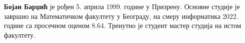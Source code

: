 \documentclass[12pt,oneside]{memoir}
\begin{document}
\literatura

\backmatter

\begin{biografija}
\textbf{Бојан Барџић} је рођен 5. априла 1999. године у Призрену. Основне студије
је завршио на Математичком факултету у Београду, на смеру информатика 2022. године
са просечном оценом 8.64. Тренутно је студент мастер студија на истом факултету.
\end{biografija}
\end{document}
